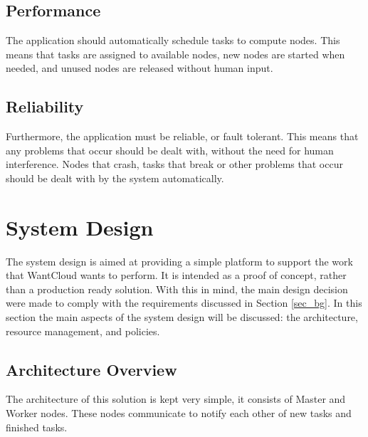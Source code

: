 \documentclass{acm_proc_article-sp}
\begin{document}
\subsection{Performance}
The application should automatically schedule tasks to compute nodes.
This means that tasks are assigned to available nodes, new nodes are started when needed, and unused nodes are released without human input.

\subsection{Reliability}
Furthermore, the application must be reliable, or fault tolerant.
This means that any problems that occur should be dealt with, without the need for human interference.
Nodes that crash, tasks that break or other problems that occur should be dealt with by the system automatically.

\section{System Design}
\label{sec_system}
The system design is aimed at providing a simple platform to support the work that WantCloud wants to perform.
It is intended as a proof of concept, rather than a production ready solution.
With this in mind, the main design decision were made to comply with the requirements discussed in Section \ref{sec_bg}.
In this section the main aspects of the system design will be discussed: the architecture, resource management, and policies.

\subsection{Architecture Overview}
The architecture of this solution is kept very simple, it consists of Master and Worker nodes.
These nodes communicate to notify each other of new tasks and finished tasks.
\end{document}
